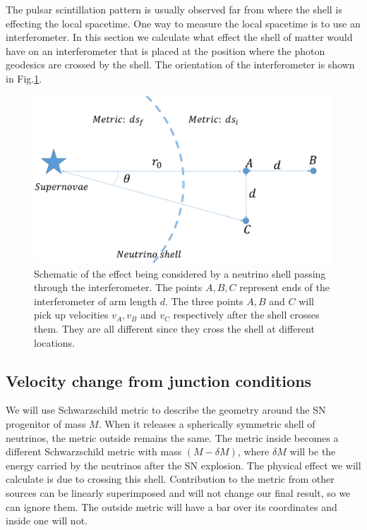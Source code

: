 \documentclass[aps,showpacs,onecolumn,floats,prd,superscriptaddress,nofootinbib]{revtex4-1}
\begin{document}
The pulsar scintillation pattern is usually observed far from where the shell is effecting the local spacetime. One way to measure the local spacetime is to use an interferometer. In this section we calculate what effect the shell of matter would have on an interferometer that is placed at the position where the photon geodesics are crossed by the shell.
The orientation of the interferometer is shown in Fig.\ref{fig:1}.

\begin{figure}[h!]
\begin{center}
\includegraphics[scale = 0.27]{intro.pdf}
\caption{Schematic of the effect being considered by a neutrino shell passing through the interferometer. The points $A,B,C$ represent ends of the interferometer of arm length $d$. The three points $A,B$ and $C$ will pick up velocities $v_A, v_B$ and $v_C$ respectively after the shell crosses them. They are all different since they cross the shell at different locations.}
\label{fig:1}
\end{center}
\end{figure}

\subsection{Velocity change from junction conditions}

We will use Schwarzschild metric to describe the geometry around the SN progenitor of mass $M$.
When it releases a spherically symmetric shell of neutrinos, the metric outside remains the same.
The metric inside becomes a different Schwarzschild metric with mass $(M-\delta M)$, where $\delta M$ will be the energy carried by the neutrinos after the SN explosion. 
The physical effect we will calculate is due to crossing this shell.
Contribution to the metric from other sources can be linearly superimposed and will not change our final result, so we can ignore them.
The outside metric will have a bar over its coordinates and inside one will not. 
 
\end{document}
